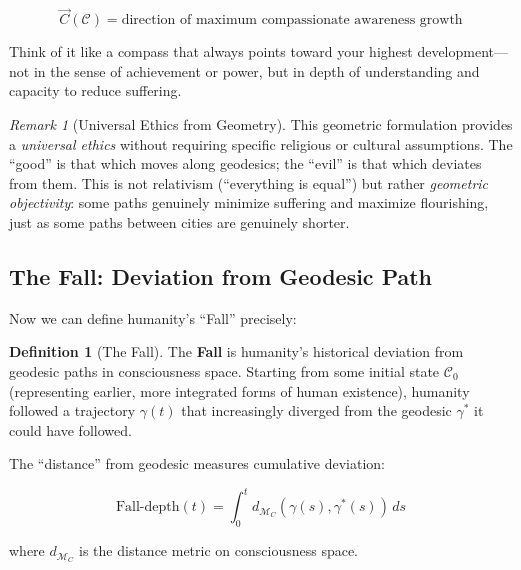 \documentclass[11pt,a4paper]{article}
\theoremstyle{definition}
\newtheorem{definition}{Definition}[section]
\theoremstyle{remark}
\newtheorem{remark}{Remark}[section]
\begin{document}
\begin{equation}
\vec{C}(\mathcal{C}) = \text{direction of maximum compassionate awareness growth}
\end{equation}

Think of it like a compass that always points toward your highest development---not in the sense of achievement or power, but in depth of understanding and capacity to reduce suffering.

\begin{remark}[Universal Ethics from Geometry]
This geometric formulation provides a \textit{universal ethics} without requiring specific religious or cultural assumptions. The ``good'' is that which moves along geodesics; the ``evil'' is that which deviates from them. This is not relativism (``everything is equal'') but rather \textit{geometric objectivity}: some paths genuinely minimize suffering and maximize flourishing, just as some paths between cities are genuinely shorter.
\end{remark}

\subsection{The Fall: Deviation from Geodesic Path}

Now we can define humanity's ``Fall'' precisely:

\begin{definition}[The Fall]\label{def:fall}
The \textbf{Fall} is humanity's historical deviation from geodesic paths in consciousness space. Starting from some initial state $\mathcal{C}_0$ (representing earlier, more integrated forms of human existence), humanity followed a trajectory $\gamma(t)$ that increasingly diverged from the geodesic $\gamma^*$ it could have followed.
\end{definition}

The ``distance'' from geodesic measures cumulative deviation:

\begin{equation}
\text{Fall-depth}(t) = \int_0^t d_{\mathcal{M}_C}(\gamma(s), \gamma^*(s)) \, ds
\end{equation}

where $d_{\mathcal{M}_C}$ is the distance metric on consciousness space.
\end{document}

